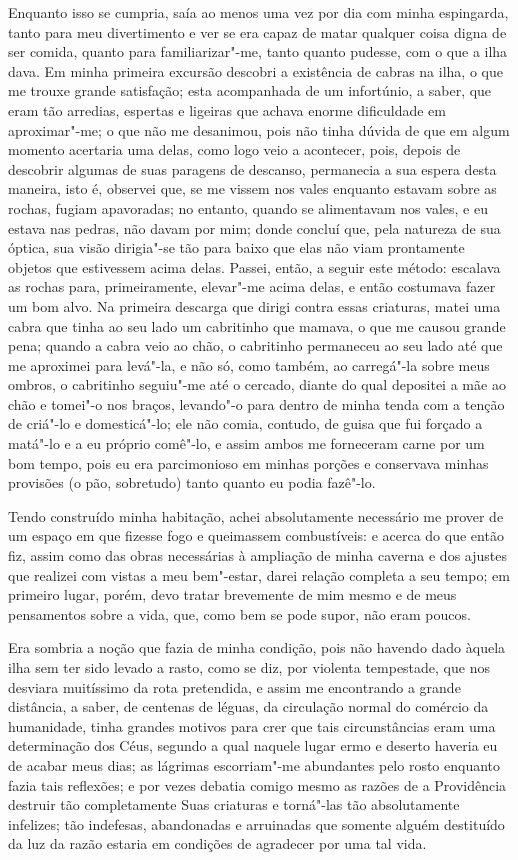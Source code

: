Enquanto isso se cumpria, saía ao menos uma vez por dia com minha
espingarda, tanto para meu divertimento e ver se era capaz de matar
qualquer coisa digna de ser comida, quanto para familiarizar"-me, tanto
quanto pudesse, com o que a ilha dava. Em minha primeira excursão
descobri a existência de cabras na ilha, o que me trouxe grande
satisfação; esta acompanhada de um infortúnio, a saber, que eram tão
arredias, espertas e ligeiras que achava enorme dificuldade em
aproximar"-me; o que não me desanimou, pois não tinha dúvida de que em
algum momento acertaria uma delas, como logo veio a acontecer, pois,
depois de descobrir algumas de suas paragens de descanso, permanecia a
sua espera desta maneira, isto é, observei que, se me vissem nos vales
enquanto estavam sobre as rochas, fugiam apavoradas; no entanto, quando
se alimentavam nos vales, e eu estava nas pedras, não davam por mim;
donde concluí que, pela natureza de sua óptica, sua visão dirigia"-se tão
para baixo que elas não viam prontamente objetos que estivessem acima
delas. Passei, então, a seguir este método: escalava as rochas para,
primeiramente, elevar"-me acima delas, e então costumava fazer um bom
alvo. Na primeira descarga que dirigi contra essas criaturas, matei uma
cabra que tinha ao seu lado um cabritinho que mamava, o que me causou
grande pena; quando a cabra veio ao chão, o cabritinho permaneceu ao seu
lado até que me aproximei para levá"-la, e não só, como também, ao
carregá"-la sobre meus ombros, o cabritinho seguiu"-me até o cercado,
diante do qual depositei a mãe ao chão e tomei"-o nos braços, levando"-o
para dentro de minha tenda com a tenção de criá"-lo e domesticá"-lo; ele
não comia, contudo, de guisa que fui forçado a matá"-lo e a eu próprio
comê"-lo, e assim ambos me forneceram carne por um bom tempo, pois eu era
parcimonioso em minhas porções e conservava minhas provisões (o pão,
sobretudo) tanto quanto eu podia fazê"-lo.

Tendo construído minha habitação, achei absolutamente necessário me
prover de um espaço em que fizesse fogo e queimassem combustíveis: e
acerca do que então fiz, assim como das obras necessárias à ampliação de
minha caverna e dos ajustes que realizei com vistas a meu bem"-estar,
darei relação completa a seu tempo; em primeiro lugar, porém, devo
tratar brevemente de mim mesmo e de meus pensamentos sobre a vida, que,
como bem se pode supor, não eram poucos.

Era sombria a noção que fazia de minha condição, pois não havendo dado
àquela ilha sem ter sido levado a rasto, como se diz, por violenta
tempestade, que nos desviara muitíssimo da rota pretendida, e assim me
encontrando a grande distância, a saber, de centenas de léguas, da
circulação normal do comércio da humanidade, tinha grandes motivos para
crer que tais circunstâncias eram uma determinação dos Céus, segundo a
qual naquele lugar ermo e deserto haveria eu de acabar meus dias; as
lágrimas escorriam"-me abundantes pelo rosto enquanto fazia tais
reflexões; e por vezes debatia comigo mesmo as razões de a Providência
destruir tão completamente Suas criaturas e torná"-las tão absolutamente
infelizes; tão indefesas, abandonadas e arruinadas que somente alguém
destituído da luz da razão estaria em condições de agradecer por uma tal
vida.

